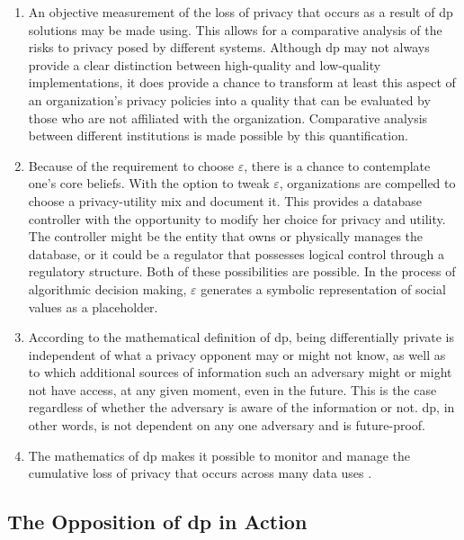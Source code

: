 \begin{enumerate}
    \item An objective measurement of the loss of privacy that occurs as a result of \acrshort{dp} solutions may be made using. This allows for a comparative analysis of the risks to privacy posed by different systems. Although \acrshort{dp} may not always provide a clear distinction between high-quality and low-quality implementations, it does provide a chance to transform at least this aspect of an organization's privacy policies into a quality that can be evaluated by those who are not affiliated with the organization. Comparative analysis between different institutions is made possible by this quantification.
    \item Because of the requirement to choose $\varepsilon$, there is a chance to contemplate one's core beliefs. With the option to tweak $\varepsilon$, organizations are compelled to choose a privacy-utility mix and document it. This provides a database controller with the opportunity to modify her choice for privacy and utility. The controller might be the entity that owns or physically manages the database, or it could be a regulator that possesses logical control through a regulatory structure. Both of these possibilities are possible. In the process of algorithmic decision making, $\varepsilon$ generates a symbolic representation of social values as a placeholder.
    \item According to the mathematical definition of \acrshort{dp}, being differentially private is independent of what a privacy opponent may or might not know, as well as to which additional sources of information such an adversary might or might not have access, at any given moment, even in the future. This is the case regardless of whether the adversary is aware of the information or not. \acrshort{dp}, in other words, is not dependent on any one adversary and is future-proof.
    \item The mathematics of \acrshort{dp} makes it possible to monitor and manage the cumulative loss of privacy that occurs across many data uses \cite{DWORK2019}.
\end{enumerate}

\subsection{The Opposition of \acrshort{dp} in Action}

